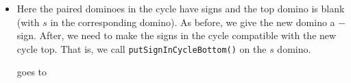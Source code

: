 \documentclass[12pt]{article}
\numberwithin{equation}{section}
\newcommand{\horizontalDominoRSShift}[4]{\filldraw [dominoRSStyle] (#2 - 1 + #4 + \eps, #1 - 1 + \eps) rectangle + (2 - \teps, 1 -\teps) node [dominoText] {$#3$};}
\newcommand{\verticalDominoRSShift}[4]{\filldraw [dominoRSStyle] (#2 - 1 + #4 + \eps,  #1 - 1 + \eps) rectangle + (1 - \teps,2 -\teps) node [dominoText] {$#3$};}
\begin{document}
\begin{itemize}
\begin{itemize}
\begin{itemize}
        \item Here the paired dominoes in the cycle have signs and the top domino is blank (with $s$ in the corresponding domino).
        As before, we give the new domino a $-$ sign.
        After, we need to make the signs in the cycle compatible with the new cycle top.
        That is, we call \texttt{putSignInCycleBottom()} on the $s$ domino.
        \begin{figure}[H]
          \centering
        \end{figure}
        goes to
        \begin{figure}[H]
          \centering

\end{figure}
\end{itemize}
\end{itemize}
\end{itemize}
\end{document}
